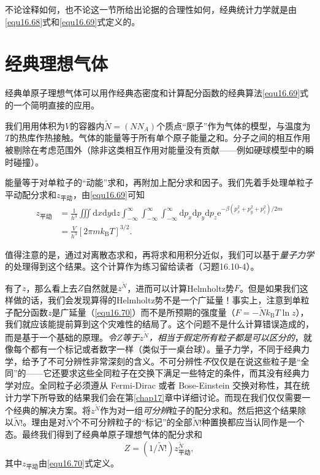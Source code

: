 不论诠释如何，也不论这一节所给出论据的合理性如何，经典统计力学就是由\eqref{equ16.68}式和\eqref{equ16.69}式定义的。
\section{经典理想气体}\label{sec16.10}
经典单原子理想气体可以用作经典态密度和计算配分函数的经典算法\eqref{equ16.69}式的一个简明直接的应用。

我们用用体积为$V$的容器内$\tilde N=(NN_A)$个质点``原子''作为气体的模型，与温度为$T$的热库作热接触。气体的能量等于所有单个原子能量之和。分子之间的相互作用被剔除在考虑范围外（除非这类相互作用对能量没有贡献——例如硬球模型中的瞬时碰撞）。

能量等于对单粒子的``动能''求和，再附加上配分求和因子。我们先着手处理单粒子平动配分求和$z_\text{平动}$，由\eqref{equ16.69}可知
\begin{equation}
\begin{aligned}
z_\text{平动}&=\frac{1}{h^3}\iiint\mathrm dx\mathrm dy\mathrm dz\int_{-\infty}^\infty\int_{-\infty}^\infty\int_{-\infty}^\infty\mathrm dp_x\mathrm dp_y\mathrm dp_z\mathrm e^{-\beta(p_x^2+p_y^2+p_z^2)/2m}\\
&= \frac{V}{h^3}\left[2\pi mk_\text{B}T\right]^{3/2}.
\end{aligned}
\label{equ16.70}
\end{equation}

值得注意的是，通过对离散态求和，再将求和用积分近似，我们可以基于{\it 量子力学}的处理得到这个结果。这个计算作为练习留给读者（习题16.10-4）。

有了$z$，那么看上去$Z$自然就是$z^{\tilde N}$，进而可以计算Helmholtz势$F$。但是如果我们这样做的话，我们会发现算得的Helmholtz势不是一个广延量！事实上，注意到单粒子配分函数$z$是广延量（\eqref{equ16.70}）而不是所预期的强度量（$F=-\tilde Nk_\text{B}T\ln z$），我们就应该能提前算到这个灾难性的结局了。这个问题不是什么计算错误造成的，而是基于一个基础的原理。{\it 令$Z$等于$z^{\tilde{N}}$，相当于假定所有粒子都是可以区分的}，就像每个都有一个标记或者数字一样（类似于一桌台球）。量子力学，不同于经典力学，给予了不可分辨性非常深刻的含义。不可分辨性{\it 不}仅仅是在说这些粒子是``全同''的——它还要求这些全同粒子在交换下满足一些特定的条件，而其没有经典力学对应。全同粒子必须遵从 Fermi-Dirac 或者 Bose-Einstein 交换对称性，其在统计力学下所导致的结果我们会在第\ref{chap17}章中详细讨论。而现在我们仅仅需要一个经典的解决方案。将$z^{\tilde N}$作为对一组{\it 可分辨}粒子的配分求和。然后把这个结果除以$\tilde N!$。理由是对$\tilde N$个不可分辨粒子的``标记''的全部$\tilde N!$种置换都应当认同作是一个态。最终我们得到了经典单原子理想气体的配分求和
\begin{equation}
Z=(1/\tilde N!)z_\text{平动}^{\tilde N},
\label{equ16.71}
\end{equation}
其中$z_\text{平动}$由\eqref{equ16.70}式定义。

